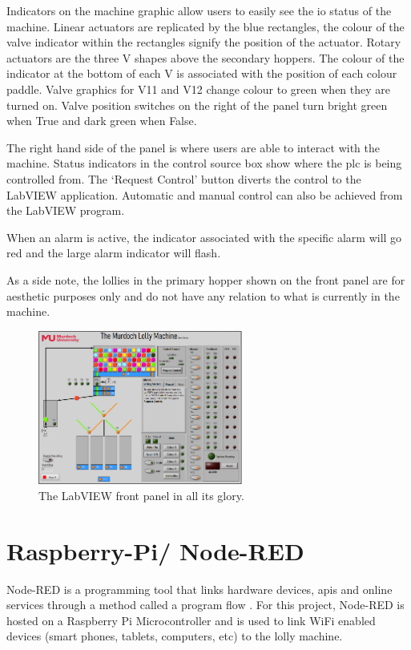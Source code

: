             Indicators on the machine graphic allow users to easily see the \acrshort{io} status of the machine. Linear actuators are replicated by the blue rectangles, the colour of the valve indicator within the rectangles signify the position of the actuator. 
            Rotary actuators are the three V shapes above the secondary hoppers. The colour of the indicator at the bottom of each V is associated with the position of each colour paddle.
            Valve graphics for V11 and V12 change colour to green when they are turned on. Valve position switches on the right of the panel turn bright green when True and dark green when False. 

            The right hand side of the panel is where users are able to interact with the machine. Status indicators in the control source box show where the \acrshort{plc} is being controlled from. The `Request Control' button diverts the control to the LabVIEW application. Automatic and manual control can also be achieved from the LabVIEW program. 

            When an alarm is active, the indicator associated with the specific alarm will go red and the large alarm indicator will flash. 

            As a side note, the lollies in the primary hopper shown on the front panel are for aesthetic purposes only and do not have any relation to what is currently in the machine. 

        \begin{figure}[H]
                \centering
                \includegraphics[width = 0.6\textwidth]{2_images/labViewFrontOverview}
                \caption{The LabVIEW front panel in all its glory.}
                \label{fig:abViewFrontOverview}
        \end{figure}               


\section{Raspberry-Pi/ Node-RED}
    Node-RED is a programming tool that links hardware devices, \acrshort{api}s and online services through a method called a program flow \cite{nodeRed}. For this project, Node-RED is hosted on a Raspberry Pi Microcontroller and is used to link WiFi enabled devices (smart phones, tablets, computers, etc) to the lolly machine.

